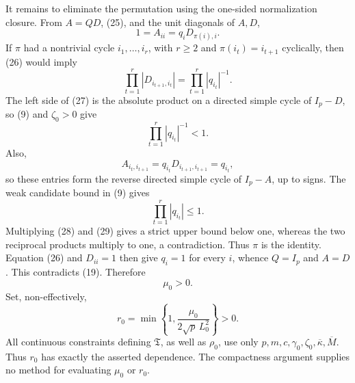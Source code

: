It remains to eliminate the permutation using the one-sided normalization closure. From \(A=QD\), (25), and the unit diagonals of \(A,D\),
\[
1=A_{ii}=q_iD_{\pi(i),i}.
\tag{26}
\]
If \(\pi\) had a nontrivial cycle \(i_1,\ldots,i_r\), with \(r\geq2\) and \(\pi(i_t)=i_{t+1}\) cyclically, then (26) would imply
\[
\prod_{t=1}^r|D_{i_{t+1},i_t}|
=\prod_{t=1}^r|q_{i_t}|^{-1}.
\tag{27}
\]
The left side of (27) is the absolute product on a directed simple cycle of \(I_p-D\), so (9) and \(\zeta_0>0\) give
\[
\prod_{t=1}^r|q_{i_t}|^{-1}<1.
\tag{28}
\]
Also,
\[
A_{i_t,i_{t+1}}
=q_{i_t}D_{i_{t+1},i_{t+1}}
=q_{i_t},
\]
so these entries form the reverse directed simple cycle of \(I_p-A\), up to signs. The weak candidate bound in (9) gives
\[
\prod_{t=1}^r|q_{i_t}|\leq1.
\tag{29}
\]
Multiplying (28) and (29) gives a strict upper bound below one, whereas the two reciprocal products multiply to one, a contradiction. Thus \(\pi\) is the identity. Equation (26) and \(D_{ii}=1\) then give \(q_i=1\) for every \(i\), whence \(Q=I_p\) and \(A=D\). This contradicts (19). Therefore
\[
\mu_0>0.
\tag{30}
\]
Set, non-effectively,
\[
r_0=\min\left\{1,\frac{\mu_0}{2\sqrt p\,L_0^2}\right\}>0.
\tag{31}
\]
All continuous constraints defining \(\mathfrak T\), as well as \(\rho_0\), use only \(p,m,c,\gamma_0,\zeta_0,\overline\kappa,\overline M\). Thus \(r_0\) has exactly the asserted dependence. The compactness argument supplies no method for evaluating \(\mu_0\) or \(r_0\).

